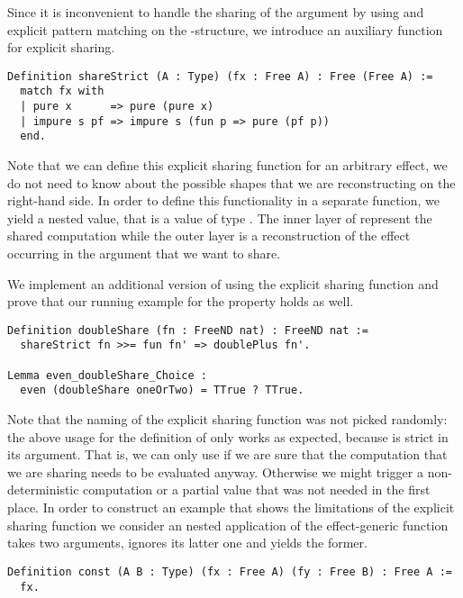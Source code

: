 Since it is inconvenient to handle the sharing of the argument  by using and explicit pattern matching on the -structure, we introduce an auxiliary function for explicit sharing.

\begin{verbatim}
Definition shareStrict (A : Type) (fx : Free A) : Free (Free A) :=
  match fx with
  | pure x      => pure (pure x)
  | impure s pf => impure s (fun p => pure (pf p))
  end.
\end{verbatim}

Note that we can define this explicit sharing function for an arbitrary effect, we do not need to know about the possible shapes that we are reconstructing on the right-hand side.
In order to define this functionality in a separate function, we yield a nested value, that is a value of type .
The inner layer of  represent the shared computation while the outer layer is a reconstruction of the effect occurring in the argument  that we want to share.

We implement an additional version of  using the explicit sharing function and prove that our running example for the property holds as well.

\begin{verbatim}
Definition doubleShare (fn : FreeND nat) : FreeND nat :=
  shareStrict fn >>= fun fn' => doublePlus fn'.

Lemma even_doubleShare_Choice :
  even (doubleShare oneOrTwo) = TTrue ? TTrue.
\end{verbatim}

Note that the naming of the explicit sharing function was not picked randomly: the above usage for the definition of  only works as expected, because  is strict in its argument.
That is, we can only use  if we are sure that the computation that we are sharing needs to be evaluated anyway.
Otherwise we might trigger a non-deterministic computation or a partial value that was not needed in the first place.
In order to construct an example that shows the limitations of the explicit sharing function we consider an nested application of the effect-generic function  takes two arguments, ignores its latter one and yields the former.

\begin{verbatim}
Definition const (A B : Type) (fx : Free A) (fy : Free B) : Free A :=
  fx.
\end{verbatim}

